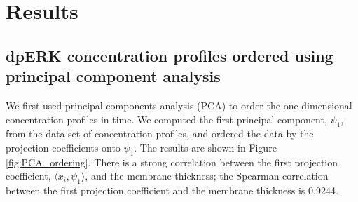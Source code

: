 \documentclass[10pt]{article}
\begin{document}
\section*{Results}

\subsection*{dpERK concentration profiles ordered using principal component analysis}

We first used principal components analysis (PCA) to order the one-dimensional concentration profiles in time. 
%
We computed the first principal component, $\psi_1$, from the data set of concentration profiles, and ordered the data by the projection coefficients onto $\psi_1$.
%
The results are shown in Figure \ref{fig:PCA_ordering}.
%
There is a strong correlation between the first projection coefficient, $\langle x_i, \psi_1 \rangle$, and the membrane thickness;
the Spearman correlation between the first projection coefficient and the membrane thickness is 0.9244.
\end{document}

